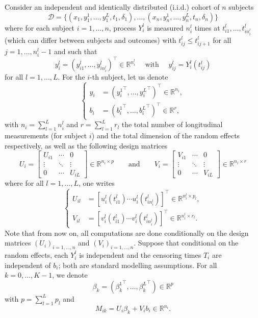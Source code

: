 \documentclass[11pt]{article}
\newcommand{\cD}{\mathcal D}
\newcommand{\R}{\mathds R}
\begin{document}
Consider an independent and identically distributed (i.i.d.) cohort of $n$ subjects
\[ \cD = \big\{ (x_1, y_1^1, \ldots, y_1^L, t_1, \delta_1), \ldots, (x_n, y_n^1, \ldots, y_n^L, t_n, \delta_n) \big\} \]
where for each subject $i=1, \ldots, n$, process $Y_i^l$ is measured $n_i^l$ times at $t_{i1}^l, \ldots, t_{in_i^l}^l$ (which can differ between subjects and outcomes) with $t_{ij}^l \leq t_{ij+1}^l$ for all $j=1, \ldots, n_i^l-1$ and such that
\[ y_i^l=(y_{i1}^l, \ldots, y_{in_i^l}^l)^\top \in \R^{n_i^l} \quad \text{ with } \quad y_{ij}^l=Y_i^l(t_{ij}^l) \]
for all $l=1, \ldots, L$. 
For the $i$-th subject, let us denote 
\[
\left\{
    \begin{array}{ll}
        y_i &= ({y_i^1}^\top, \ldots, {y_i^L}^\top)^\top \in \R^{n_i},\\
        b_i &= ({b_i^1}^\top, \ldots, {b_i^L}^\top)^\top \in \R^r,
    \end{array}
\right.
\]
with $n_i = \sum_{l=1}^L n_i^l$ and $r = \sum_{l=1}^L r_l$ the total number of longitudinal measurements (for subject $i$) and the total dimension of the random effects respectively, as well as the following design matrices
\[ U_i = 
\begin{bmatrix}
  U_{i1} & \cdots & 0\\
  \vdots &  \ddots & \vdots \\
  0 & \cdots & U_{iL}
\end{bmatrix} 
\in \R^{n_i \times p}
\qquad \text{and} \qquad
V_i = 
\begin{bmatrix}
  V_{i1} & \cdots & 0\\
  \vdots &  \ddots & \vdots \\
  0 & \cdots & V_{iL}
\end{bmatrix}
\in \R^{n_i \times r}
\]
where for all $l=1, \ldots, L$, one writes
\[
\left\{
    \begin{array}{ll}
        U_{il} &= [u_i^l(t_{i1}^l) \cdots u_i^l(t_{in_i^l}^l)]^\top \in \R^{n_i^l \times p_l},\\
        V_{il} &= [v_i^l(t_{i1}^l) \cdots v_i^l(t_{in_i^l}^l)]^\top \in \R^{n_i^l \times r_l}.
    \end{array}
\right.
\]
Note that from now on, all computations are done conditionally on the design matrices $(U_i)_{i=1, \dots, n}$ and $(V_i)_{i=1, \dots, n}$.
Suppose that conditional on the random effects, each $Y_i^l$ is independent and the censoring times $T_i$ are independent of $b_i$; both are standard modelling assumptions.
For all $k = 0, \ldots, K-1$, we denote 
\[ \beta_k = ({\beta_k^1}^\top, \ldots, {\beta_k^L}^\top) \in \R^p \] 
with $p = \sum_{l=1}^L p_l$ and 
\[M_{ik} = U_i\beta_k + V_ib_i \in \R^{n_i}. \]
\end{document}
